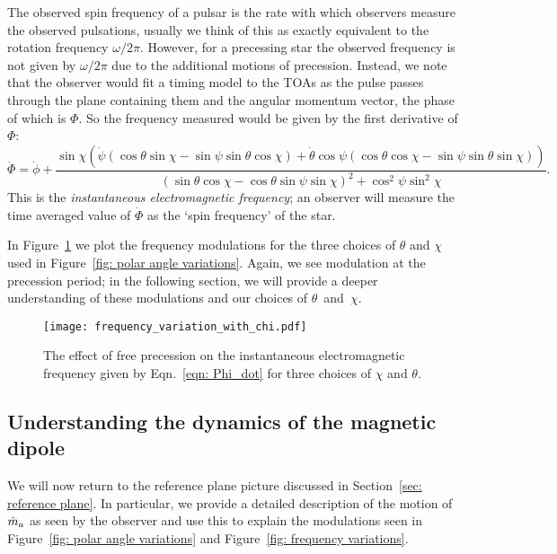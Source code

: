 \documentclass[../full_thesis/full_thesis.tex]{subfiles}
\begin{document}
The observed spin frequency of a pulsar is the rate with which observers measure the
observed pulsations, usually we think of this as exactly equivalent to the
rotation frequency $\omega/2\pi$. However, for a precessing star the observed
frequency is not given by $\omega/2\pi$ due to the additional motions of precession.
Instead, we note that the observer would fit a timing model to the TOAs as the
pulse passes through the plane containing them and the angular momentum vector,
the phase of which is $\Phi$. So the frequency measured would be given by the
first derivative of $\Phi$:
\begin{equation}
\dot{\Phi} = \dot{\phi}
+ \frac{\sin\chi \left(
\dot{\psi} (\cos\theta\sin\chi - \sin \psi \sin \theta \cos\chi) +
\dot{\theta} \cos\psi (\cos\theta\cos\chi - \sin \psi \sin \theta \sin\chi)\right)
}{(\sin\theta \cos \chi - \cos \theta \sin \psi \sin \chi)^{2} + \cos^{2}\psi \sin^{2} \chi}.
\label{eqn: Phi_dot}
\end{equation}
This is the \emph{instantaneous electromagnetic frequency}; an observer
will measure the time averaged value of $\dot{\Phi}$ as the `spin frequency' of
the star.

In Figure~\ref{fig: frequency variations} we plot the frequency modulations for
the three choices of $\theta$ and $\chi$ used in Figure~\ref{fig: polar angle variations}.
Again, we see modulation at the precession period; in the following section, we
will provide a deeper understanding of these modulations and our choices of
$\theta$~and~$\chi$.
\begin{figure}[htb]
\centering
  \texttt{[image: frequency\_variation\_with\_chi.pdf]}
\caption{The effect of free precession on the instantaneous electromagnetic
frequency given by Eqn.~\eqref{eqn: Phi_dot} for three choices of $\chi$ and
$\theta$.}
\label{fig: frequency variations}
\end{figure}


\subsection{Understanding the dynamics of the magnetic dipole}
\label{sec: understanding the motion of m}

We will now return to the reference plane picture discussed in Section~\ref{sec:
reference plane}. In particular, we provide a detailed description of
the motion of $\hat{m}_a$ as seen by the observer and use this to explain the
modulations seen in Figure~\ref{fig: polar angle variations} and Figure~\ref{fig:
frequency variations}.
\end{document}
